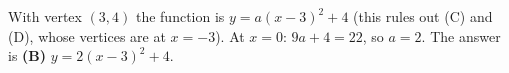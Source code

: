 With vertex $(3,4)$ the function is $y=a(x-3)^2+4$ (this rules out (C) and (D), whose vertices are at $x=-3$). At $x=0$: $9a+4=22$, so $a=2$. The answer is \textbf{(B)} $y=2(x-3)^2+4$.
